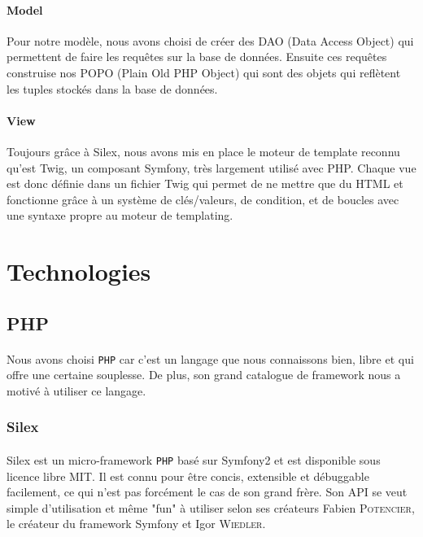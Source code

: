 \documentclass[12pt]{article}
\begin{document}
        \paragraph{Model} Pour notre modèle, nous avons choisi de créer des DAO (Data Access Object) qui permettent de faire les requêtes sur la base de données. Ensuite ces requêtes construise nos POPO (Plain Old PHP Object) qui sont des objets qui reflètent les tuples stockés dans la base de données.
        
        \paragraph{View} Toujours grâce à Silex, nous avons mis en place le moteur de template reconnu qu'est Twig, un composant Symfony, très largement utilisé avec PHP. Chaque vue est donc définie dans un fichier Twig qui permet de ne mettre que du HTML et fonctionne grâce à un système de clés/valeurs, de condition, et de boucles avec une syntaxe propre au moteur de templating.
        
\section{Technologies}
    \subsection{PHP}
        \paragraph{} Nous avons choisi \texttt{PHP} car c'est un langage que nous connaissons bien, libre et qui offre une certaine souplesse. De plus, son grand catalogue de framework nous a motivé à utiliser ce langage. 
    
        \subsubsection{Silex}
            \paragraph{} Silex est un micro-framework \texttt{PHP} basé sur Symfony2 et est disponible sous licence libre MIT. Il est connu pour être concis, extensible et débuggable facilement, ce qui n'est pas forcément le cas de son grand frère. Son API se veut simple d'utilisation et même "fun" à utiliser selon ses créateurs Fabien \textsc{Potencier}, le créateur du framework Symfony et Igor \textsc{Wiedler}.
        
\end{document}
